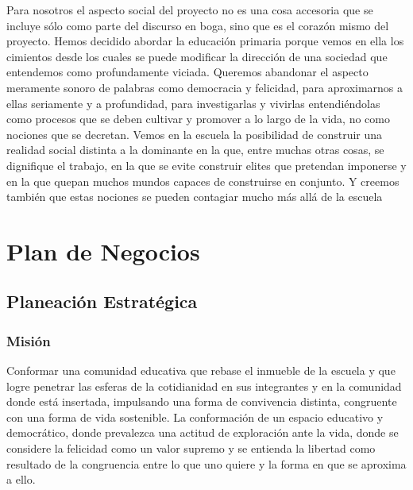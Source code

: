 \documentclass[10pt,letterpaper,oneside]{book}
\begin{document}
Para nosotros el aspecto social del proyecto no es una cosa accesoria que se incluye sólo como parte del discurso en boga, sino que es el corazón mismo del proyecto. Hemos decidido abordar la educación primaria porque vemos en ella los cimientos desde los cuales se puede modificar la dirección de una sociedad que entendemos como profundamente viciada. Queremos abandonar el aspecto meramente sonoro de palabras como democracia y felicidad, para aproximarnos a ellas seriamente y a profundidad, para investigarlas y vivirlas entendiéndolas como procesos que se deben cultivar y promover a lo largo de la vida, no como nociones que se decretan. Vemos en la escuela la posibilidad de construir una realidad social distinta a la dominante en la que, entre muchas otras cosas, se dignifique el trabajo, en la que se evite construir elites que pretendan imponerse y en la que quepan muchos mundos capaces de construirse en conjunto. Y creemos también que estas nociones se pueden contagiar mucho más allá de la escuela


\chapter{Plan de Negocios}

\section{Planeación Estratégica}
\subsection*{Misión}

Conformar una comunidad educativa que rebase el inmueble de la escuela y que logre penetrar las esferas de la cotidianidad en sus integrantes y en la comunidad donde está insertada, impulsando una forma de convivencia distinta, congruente con una forma de vida sostenible. La conformación de un espacio educativo y democrático, donde prevalezca una actitud de exploración ante la vida, donde se considere la felicidad como un valor supremo y se entienda la libertad como resultado de la congruencia entre lo que uno quiere y la forma en que se aproxima a ello. 
\end{document}
